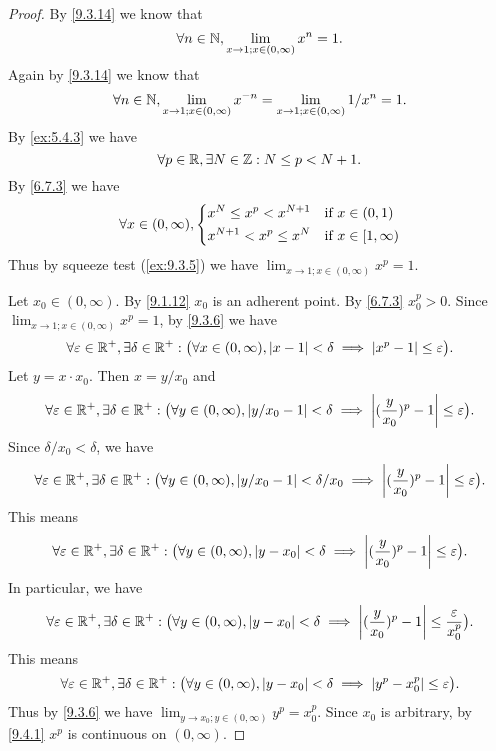 \begin{proof}
  By \cref{9.3.14} we know that
  \[
    \forall n \in \mathbb{N}, \lim_{x \to 1 ; x \in (0, \infty)} x^n = 1.
  \]
  Again by \cref{9.3.14} we know that
  \[
    \forall n \in \mathbb{N}, \lim_{x \to 1 ; x \in (0, \infty)} x^{-n} = \lim_{x \to 1 ; x \in (0, \infty)} 1 / x^n = 1.
  \]
  By \cref{ex:5.4.3} we have
  \[
    \forall p \in \mathbb{R}, \exists N \in \mathbb{Z} : N \leq p < N + 1.
  \]
  By \cref{6.7.3} we have
  \[
    \forall x \in (0, \infty), \begin{dcases}
      x^N \leq x^p < x^{N + 1}   & \text{if } x \in (0, 1)      \\
      x^{N + 1} < x^p \leq x^{N} & \text{if } x \in [1, \infty)
    \end{dcases}
  \]
  Thus by squeeze test (\cref{ex:9.3.5}) we have \(\lim_{x \to 1 ; x \in (0, \infty)} x^p = 1\).

  Let \(x_0 \in (0, \infty)\).
  By \cref{9.1.12} \(x_0\) is an adherent point.
  By \cref{6.7.3} \(x_0^p > 0\).
  Since \(\lim_{x \to 1 ; x \in (0, \infty)} x^p = 1\), by \cref{9.3.6} we have
  \[
    \forall \varepsilon \in \mathbb{R}^+, \exists \delta \in \mathbb{R}^+ : \big(\forall x \in (0, \infty), \left\lvert x - 1\right\rvert < \delta \implies \left\lvert x^p - 1\right\rvert \leq \varepsilon\big).
  \]
  Let \(y = x \cdot x_0\).
  Then \(x = y / x_0\) and
  \[
    \forall \varepsilon \in \mathbb{R}^+, \exists \delta \in \mathbb{R}^+ : \big(\forall y \in (0, \infty), \left\lvert y / x_0 - 1\right\rvert < \delta \implies \left\lvert(\dfrac{y}{x_0})^p - 1\right\rvert \leq \varepsilon\big).
  \]
  Since \(\delta / x_0 < \delta\), we have
  \[
    \forall \varepsilon \in \mathbb{R}^+, \exists \delta \in \mathbb{R}^+ : \big(\forall y \in (0, \infty), \left\lvert y / x_0 - 1\right\rvert < \delta / x_0 \implies \left\lvert(\dfrac{y}{x_0})^p - 1\right\rvert \leq \varepsilon\big).
  \]
  This means
  \[
    \forall \varepsilon \in \mathbb{R}^+, \exists \delta \in \mathbb{R}^+ : \big(\forall y \in (0, \infty), \left\lvert y - x_0\right\rvert < \delta \implies \left\lvert(\dfrac{y}{x_0})^p - 1\right\rvert \leq \varepsilon\big).
  \]
  In particular, we have
  \[
    \forall \varepsilon \in \mathbb{R}^+, \exists \delta \in \mathbb{R}^+ : \big(\forall y \in (0, \infty), \left\lvert y - x_0\right\rvert < \delta \implies \left\lvert(\dfrac{y}{x_0})^p - 1\right\rvert \leq \dfrac{\varepsilon}{x_0^p}\big).
  \]
  This means
  \[
    \forall \varepsilon \in \mathbb{R}^+, \exists \delta \in \mathbb{R}^+ : \big(\forall y \in (0, \infty), \left\lvert y - x_0\right\rvert < \delta \implies \left\lvert y^p - x_0^p\right\rvert \leq \varepsilon\big).
  \]
  Thus by \cref{9.3.6} we have \(\lim_{y \to x_0 ; y \in (0, \infty)} y^p = x_0^p\).
  Since \(x_0\) is arbitrary, by \cref{9.4.1} \(x^p\) is continuous on \((0, \infty)\).
\end{proof}


